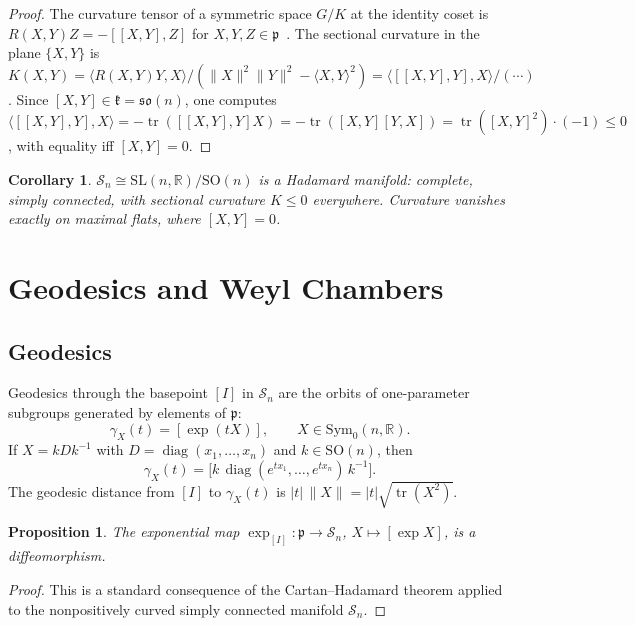\documentclass[12pt]{article}
\newtheorem{proposition}[theorem]{Proposition}
\newtheorem{corollary}[theorem]{Corollary}
\theoremstyle{definition}
\theoremstyle{remark}
\newcommand{\R}{\mathbb{R}}
\newcommand{\SL}{\mathrm{SL}}
\newcommand{\SO}{\mathrm{SO}}
\newcommand{\Symz}{\mathrm{Sym}_{0}}
\newcommand{\calM}{\mathcal{S}}
\newcommand{\tr}{\operatorname{tr}}
\newcommand{\diag}{\operatorname{diag}}
\begin{document}
\begin{proof}
The curvature tensor of a symmetric space $G/K$ at the identity coset
is $R(X,Y)Z = -[[X,Y],Z]$ for $X,Y,Z \in \mathfrak{p}$~\cite[Ch.~IV]{Helgason}.
The sectional curvature in the plane $\{X,Y\}$ is
$K(X,Y) = \langle R(X,Y)Y, X\rangle / (\|X\|^2\|Y\|^2 - \langle X,Y\rangle^2)
= \langle [[X,Y],Y], X\rangle / (\cdots)$.
Since $[X,Y] \in \mathfrak{k} = \mathfrak{so}(n)$, one computes
$\langle [[X,Y],Y],X\rangle = -\tr([[X,Y],Y]X) = -\tr([X,Y][Y,X])
= \tr([X,Y]^2) \cdot (-1) \leq 0$,
with equality iff $[X,Y] = 0$.
\end{proof}

\begin{corollary}
$\calM_n \cong \SL(n,\R)/\SO(n)$ is a Hadamard manifold: complete,
simply connected, with sectional curvature $K \leq 0$ everywhere.
Curvature vanishes exactly on maximal flats, where $[X,Y]=0$.
\end{corollary}

\section{Geodesics and Weyl Chambers}
\label{sec:weyl}

\subsection{Geodesics}

Geodesics through the basepoint $[I]$ in $\calM_n$ are the orbits
of one-parameter subgroups generated by elements of $\mathfrak{p}$:
\[
  \gamma_X(t) = [\exp(tX)], \qquad X \in \Symz(n,\R).
\]
If $X = k D k^{-1}$ with $D = \diag(x_1,\ldots,x_n)$ and
$k \in \SO(n)$, then
\[
  \gamma_X(t) = \bigl[k\,\diag(e^{tx_1},\ldots,e^{tx_n})\,k^{-1}\bigr].
\]
The geodesic distance from $[I]$ to $\gamma_X(t)$ is
$|t|\,\|X\| = |t|\sqrt{\tr(X^2)}$.

\begin{proposition}
The exponential map $\exp_{[I]} : \mathfrak{p} \to \calM_n$,
$X \mapsto [\exp X]$, is a diffeomorphism.
\end{proposition}

\begin{proof}
This is a standard consequence of the Cartan--Hadamard theorem applied
to the nonpositively curved simply connected manifold $\calM_n$.
\end{proof}
\end{document}
